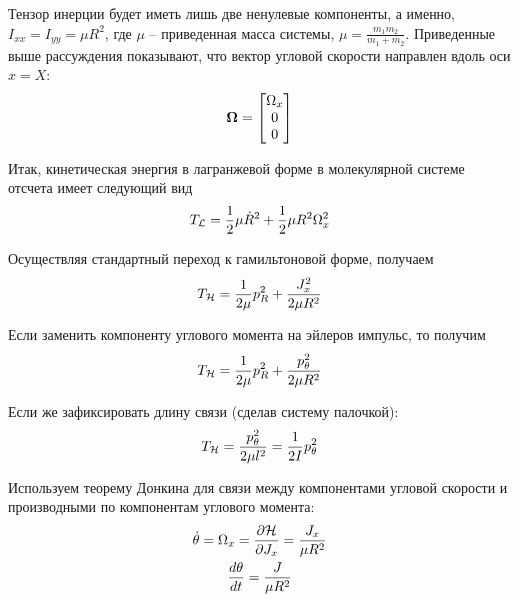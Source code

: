 \documentclass[12pt]{article}
\newcommand{\mL}{\mathcal{L}}
\newcommand{\mH}{\mathcal{H}}
\newcommand{\mf}{\mathbf}
\begin{document}
Тензор инерции будет иметь лишь две ненулевые компоненты, а именно, $I_{xx} = I_{yy} = \mu R^2$, где $\mu$ -- приведенная масса системы, $\mu = \displaystyle \frac{m_1 m_2}{m_1 + m_2}$. Приведенные выше рассуждения показывают, что вектор угловой скорости направлен вдоль оси $x = X$:
\begin{gather}
	\mf{\Omega} = \begin{bmatrix}
		\Omega_x \\
		0 \\ 
		0
	\end{bmatrix} \notag
\end{gather}

Итак, кинетическая энергия в лагранжевой форме в молекулярной системе отсчета имеет следующий вид
\begin{gather}
		T_\mL = \frac{1}{2} \mu \dot{R}^2 + \frac{1}{2} \mu R^2 \Omega_x^2 \notag 
\end{gather}

Осуществляя стандартный переход к гамильтоновой форме, получаем
\begin{gather}
	T_\mH = \frac{1}{2 \mu} p_R^2 + \frac{J_x^2}{2 \mu R^2} \notag
\end{gather}

Если заменить компоненту углового момента на эйлеров импульс, то получим
\begin{gather}
	T_\mH = \frac{1}{2 \mu} p_R^2 + \frac{p_\theta^2}{2 \mu R^2} \notag
\end{gather}

Если же зафиксировать длину связи (сделав систему палочкой):
\begin{gather}
	T_\mH = \frac{p_\theta^2}{2 \mu l^2} = \frac{1}{2 I} p_\theta^2 \notag
\end{gather}

Используем теорему Донкина для связи между компонентами угловой скорости и производными по компонентам углового момента:
\begin{gather}
	\dot{\theta} = \Omega_x = \frac{\partial \mH}{\partial J_x} = \frac{J_x}{\mu R^2} \notag \\ 
	\frac{d \theta}{dt} = \frac{J}{\mu R^2} \notag
\end{gather}
\end{document}
